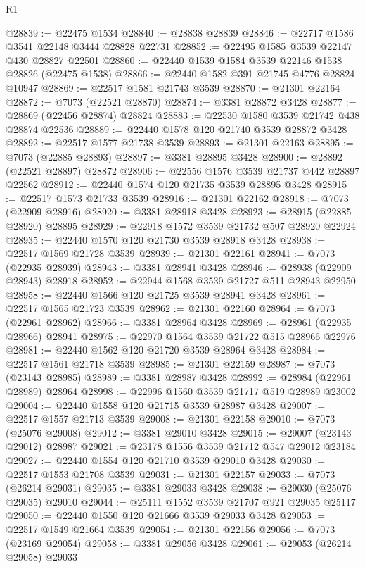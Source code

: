 \begin{lexlean}{R1}
\begin{coremodule}
@28839 := @22475 @1534
@28840 := @28838 @28839
@28846 := @22717 @1586 @3541 @22148 @3444 @28828 @22731
@28852 := @22495 @1585 @3539 @22147 @430 @28827 @22501
@28860 := @22440 @1539 @1584 @3539 @22146 @1538 @28826 (@22475 @1538)
@28866 := @22440 @1582 @391 @21745 @4776 @28824 @10947
@28869 := @22517 @1581 @21743 @3539
@28870 := @21301 @22164
@28872 := @7073 (@22521 @28870)
@28874 := @3381 @28872 @3428
@28877 := @28869 (@22456 @28874) @28824
@28883 := @22530 @1580 @3539 @21742 @438 @28874 @22536
@28889 := @22440 @1578 @120 @21740 @3539 @28872 @3428
@28892 := @22517 @1577 @21738 @3539
@28893 := @21301 @22163
@28895 := @7073 (@22885 @28893)
@28897 := @3381 @28895 @3428
@28900 := @28892 (@22521 @28897) @28872
@28906 := @22556 @1576 @3539 @21737 @442 @28897 @22562
@28912 := @22440 @1574 @120 @21735 @3539 @28895 @3428
@28915 := @22517 @1573 @21733 @3539
@28916 := @21301 @22162
@28918 := @7073 (@22909 @28916)
@28920 := @3381 @28918 @3428
@28923 := @28915 (@22885 @28920) @28895
@28929 := @22918 @1572 @3539 @21732 @507 @28920 @22924
@28935 := @22440 @1570 @120 @21730 @3539 @28918 @3428
@28938 := @22517 @1569 @21728 @3539
@28939 := @21301 @22161
@28941 := @7073 (@22935 @28939)
@28943 := @3381 @28941 @3428
@28946 := @28938 (@22909 @28943) @28918
@28952 := @22944 @1568 @3539 @21727 @511 @28943 @22950
@28958 := @22440 @1566 @120 @21725 @3539 @28941 @3428
@28961 := @22517 @1565 @21723 @3539
@28962 := @21301 @22160
@28964 := @7073 (@22961 @28962)
@28966 := @3381 @28964 @3428
@28969 := @28961 (@22935 @28966) @28941
@28975 := @22970 @1564 @3539 @21722 @515 @28966 @22976
@28981 := @22440 @1562 @120 @21720 @3539 @28964 @3428
@28984 := @22517 @1561 @21718 @3539
@28985 := @21301 @22159
@28987 := @7073 (@23143 @28985)
@28989 := @3381 @28987 @3428
@28992 := @28984 (@22961 @28989) @28964
@28998 := @22996 @1560 @3539 @21717 @519 @28989 @23002
@29004 := @22440 @1558 @120 @21715 @3539 @28987 @3428
@29007 := @22517 @1557 @21713 @3539
@29008 := @21301 @22158
@29010 := @7073 (@25076 @29008)
@29012 := @3381 @29010 @3428
@29015 := @29007 (@23143 @29012) @28987
@29021 := @23178 @1556 @3539 @21712 @547 @29012 @23184
@29027 := @22440 @1554 @120 @21710 @3539 @29010 @3428
@29030 := @22517 @1553 @21708 @3539
@29031 := @21301 @22157
@29033 := @7073 (@26214 @29031)
@29035 := @3381 @29033 @3428
@29038 := @29030 (@25076 @29035) @29010
@29044 := @25111 @1552 @3539 @21707 @921 @29035 @25117
@29050 := @22440 @1550 @120 @21666 @3539 @29033 @3428
@29053 := @22517 @1549 @21664 @3539
@29054 := @21301 @22156
@29056 := @7073 (@23169 @29054)
@29058 := @3381 @29056 @3428
@29061 := @29053 (@26214 @29058) @29033

\end{coremodule}
\end{lexlean}

